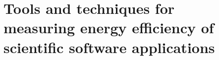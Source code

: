 \chapter{Tools and techniques for \\ measuring energy efficiency of \\scientific 
software applications}

